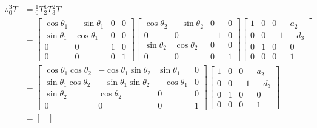 \documentclass{article}
\begin{document}
\begin{enumerate}
        \begin{align*}
            \therefore{}^{3}_{0}T &= {}^{1}_{0}T{}^{1}_{2}T{}^{2}_{3}T \\
            &=
            \begin{bmatrix}
                \cos{\theta_{1}} & -\sin{\theta_{1}} & 0 & 0 \\
                \sin{\theta_{1}} & \cos{\theta_{1}} & 0 & 0 \\
                0 & 0 & 1 & 0 \\
                0 & 0 & 0 & 1
            \end{bmatrix}
            \begin{bmatrix}
                \cos{\theta_{2}} & -\sin{\theta_{2}} & 0 & 0 \\
                0 & 0 & -1 & 0 \\
                \sin{\theta_{2}} & \cos{\theta_{2}} & 0 & 0 \\
                0 & 0 & 0 & 1
            \end{bmatrix}
            \begin{bmatrix}
                1 & 0 & 0 & a_{2} \\
                0 & 0 & -1 & -d_{3} \\
                0 & 1 & 0 & 0 \\
                0 & 0 & 0 & 1
            \end{bmatrix}
            \\
            &=
            \begin{bmatrix}
                \cos{\theta_{1}}\cos{\theta_{2}} & -\cos{\theta_{1}}\sin{\theta_{2}} & \sin{\theta_{1}} & 0 \\
                \sin{\theta_{1}}\cos{\theta_{2}} & -\sin{\theta_{1}}\sin{\theta_{2}} & -\cos{\theta_{1}} & 0 \\
                \sin{\theta_{2}} & \cos{\theta_{2}} & 0 & 0 \\
                0 & 0 & 0 & 1
            \end{bmatrix}
            \begin{bmatrix}
                1 & 0 & 0 & a_{2} \\
                0 & 0 & -1 & -d_{3} \\
                0 & 1 & 0 & 0 \\
                0 & 0 & 0 & 1
            \end{bmatrix}
            \\
            &= 
            \begin{bmatrix}

\end{bmatrix}
\end{align*}
\end{enumerate}
\end{document}
